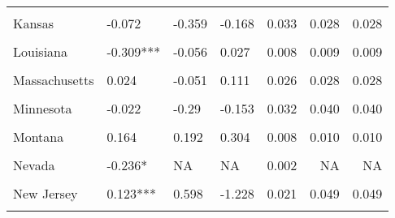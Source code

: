 \begin{table}[!h]
\begin{tabular}[t]{llllrrr}
\cellcolor{gray!10}{Indiana} & \cellcolor{gray!10}{0.129} & \cellcolor{gray!10}{-0.234*} & \cellcolor{gray!10}{-0.006} & \cellcolor{gray!10}{0.034} & \cellcolor{gray!10}{0.039} & \cellcolor{gray!10}{0.039}\\
Kansas & -0.072 & -0.359 & -0.168 & 0.033 & 0.028 & 0.028\\
\cellcolor{gray!10}{Kentucky} & \cellcolor{gray!10}{-0.145} & \cellcolor{gray!10}{-0.653} & \cellcolor{gray!10}{-0.464} & \cellcolor{gray!10}{0.017} & \cellcolor{gray!10}{0.022} & \cellcolor{gray!10}{0.022}\\
Louisiana & -0.309*** & -0.056 & 0.027 & 0.008 & 0.009 & 0.009\\
\cellcolor{gray!10}{Maine} & \cellcolor{gray!10}{-0.024} & \cellcolor{gray!10}{NA} & \cellcolor{gray!10}{NA} & \cellcolor{gray!10}{0.012} & \cellcolor{gray!10}{NA} & \cellcolor{gray!10}{NA}\\
Massachusetts & 0.024 & -0.051 & 0.111 & 0.026 & 0.028 & 0.028\\
\cellcolor{gray!10}{Michigan} & \cellcolor{gray!10}{-0.124} & \cellcolor{gray!10}{-0.145} & \cellcolor{gray!10}{0.018} & \cellcolor{gray!10}{0.060} & \cellcolor{gray!10}{0.065} & \cellcolor{gray!10}{0.065}\\
Minnesota & -0.022 & -0.29 & -0.153 & 0.032 & 0.040 & 0.040\\
\cellcolor{gray!10}{Mississippi} & \cellcolor{gray!10}{0.083} & \cellcolor{gray!10}{-0.235***} & \cellcolor{gray!10}{0.044} & \cellcolor{gray!10}{0.012} & \cellcolor{gray!10}{0.016} & \cellcolor{gray!10}{0.016}\\
Montana & 0.164 & 0.192 & 0.304 & 0.008 & 0.010 & 0.010\\
\cellcolor{gray!10}{Nebraska} & \cellcolor{gray!10}{0.559} & \cellcolor{gray!10}{-0.013} & \cellcolor{gray!10}{0.589} & \cellcolor{gray!10}{0.026} & \cellcolor{gray!10}{0.018} & \cellcolor{gray!10}{0.018}\\
Nevada & -0.236* & NA & NA & 0.002 & NA & NA\\
\cellcolor{gray!10}{New Hampshire} & \cellcolor{gray!10}{0.047} & \cellcolor{gray!10}{-0.031} & \cellcolor{gray!10}{0.039} & \cellcolor{gray!10}{0.007} & \cellcolor{gray!10}{0.011} & \cellcolor{gray!10}{0.011}\\
New Jersey & 0.123*** & 0.598 & -1.228 & 0.021 & 0.049 & 0.049\\
\cellcolor{gray!10}{New Mexico} & \cellcolor{gray!10}{-0.151} & \cellcolor{gray!10}{0.106} & \cellcolor{gray!10}{-0.245*} & \cellcolor{gray!10}{0.010} & \cellcolor{gray!10}{0.007} & \cellcolor{gray!10}{0.007}\\

\end{tabular}
\end{table}
